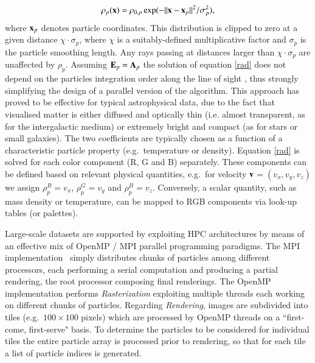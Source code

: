 \documentclass[preprint,5pt]{elsarticle}
\begin{document}
\begin{itemize}
\begin{equation}
\rho_p({\bf x}) = \rho_{0,p}\exp(-{||{\bf x}-{\bf x}_p||}^2/\sigma_p^2),
\end{equation}
where ${\bf x}_p$ denotes particle coordinates. This distribution is clipped to zero at a given distance $\chi\cdot\sigma_p$, 
where $\chi$ is a suitably-defined multiplicative factor and $\sigma_p$ is the particle smoothing length. Any rays passing at distances larger than $\chi\cdot\sigma_p$ are unaffected by $\rho_p$. 
Assuming ${\bf E}_p = {\bf A}_p$ the solution of equation \eqref{rad} does not depend on the particles integration 
order along the line of sight \cite{2008NJPh...10l5006D}, thus strongly simplifying the design of a parallel 
version of the algorithm.
This approach has proved to be
effective for typical astrophysical data, due to the fact that visualised matter is either diffused and optically thin 
(i.e. almost transparent, as for the intergalactic medium) or extremely bright and compact (as for stars or small galaxies).
The two coefficients 
are typically chosen as a function of a characteristic particle property (e.g.\ temperature or density).
Equation \eqref{rad} is solved for each color component (R, G and B) separately. These components can be defined based on relevant physical quantities, e.g.\ for velocity $\bf v$$=(v_x, v_y, v_z)$ we assign $\rho_p^{R}=v_x$, $\rho_p^{G}=v_y$ and $\rho_p^{B}=v_z$. Conversely, a scalar quantity, such as mass density or temperature, can be mapped to RGB components via look-up tables (or palettes). 
\end{itemize}
Large-scale datasets are supported by exploiting HPC architectures by means of an effective mix of OpenMP / MPI parallel programming paradigms. The MPI implementation~\cite{jin:high-performance}  simply distributes chunks of particles among different processors, each performing a serial computation and producing a partial rendering, the root processor composing final renderings. The OpenMP implementation performs {\it Rasterization} exploiting multiple threads each working on different chunks of particles. Regarding {\it Rendering}, images are subdivided into tiles (e.g.\ $100 \times 100$ pixels) which are processed by OpenMP threads on a ``first-come, first-serve" basis. To determine the particles to be considered for individual tiles the entire particle array is processed prior to rendering, so that for each tile a list of particle indices is generated.
\end{document}

